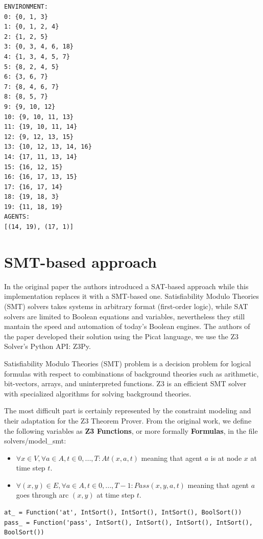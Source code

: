 \documentclass[12pt, a4paper, hidelinks]{article}
\numberwithin{equation}{section}
\begin{document}
\begin{lstlisting}[label={lst:environment}]
ENVIRONMENT:
0: {0, 1, 3}
1: {0, 1, 2, 4}
2: {1, 2, 5}
3: {0, 3, 4, 6, 18}
4: {1, 3, 4, 5, 7}
5: {8, 2, 4, 5}
6: {3, 6, 7}
7: {8, 4, 6, 7}
8: {8, 5, 7}
9: {9, 10, 12}
10: {9, 10, 11, 13}
11: {19, 10, 11, 14}
12: {9, 12, 13, 15}
13: {10, 12, 13, 14, 16}
14: {17, 11, 13, 14}
15: {16, 12, 15}
16: {16, 17, 13, 15}
17: {16, 17, 14}
18: {19, 18, 3}
19: {11, 18, 19}
AGENTS:
[(14, 19), (17, 1)]
\end{lstlisting}


\section{SMT-based approach}\label{sec:smt-based-approach}
In the original paper the authors introduced a SAT-based approach while this implementation replaces it with a SMT-based one. 
Satisfiability Modulo Theories (SMT) solvers takes systems in arbitrary format (first-order logic), while SAT solvers are limited to Boolean equations and variables, nevertheless they still mantain the speed and automation of today's Boolean engines.
The authors of the paper developed their solution using the Picat language, we use the Z3 Solver's Python API: Z3Py.
\begin{quoting}[font=itshape, begintext={``}, endtext={''\cite{z3_tutorial}}]
Satisfiability Modulo Theories (SMT) problem is a decision problem for logical formulas with respect to combinations of background theories such as arithmetic, bit-vectors, arrays, and uninterpreted functions.
Z3 is an efficient SMT solver with specialized algorithms for solving background theories.
\end{quoting}
The most difficult part is certainly represented by the constraint modeling and their adaptation for the Z3 Theorem Prover.
From the original work, we define the following variables as \textbf{Z3 Functions}, or more formally \textbf{Formulas}, in the file solvers/model\_smt:

\begin{itemize}
\item $\forall x \in V, \forall a \in A, t \in {0, ..., T} : At(x, a, t)$ meaning that agent $a$ is at node $x$ at time step $t$.
\item $\forall(x, y)\in E, \forall a \in A, t \in {0, ..., T-1} : Pass(x, y, a, t)$ meaning that agent $a$ goes through arc $(x, y)$ at time step $t$. 
\end{itemize}

\begin{lstlisting}[label={lst:atpass}]
at_ = Function('at', IntSort(), IntSort(), IntSort(), BoolSort())
pass_ = Function('pass', IntSort(), IntSort(), IntSort(), IntSort(), BoolSort())
\end{lstlisting}
\end{document}
